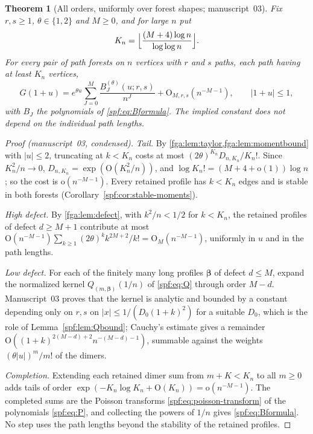 \documentclass[11pt]{article}
\numberwithin{equation}{section}
\newtheorem{theorem}{Theorem}[section]
\theoremstyle{definition}
\theoremstyle{remark}
\theoremstyle{definition}
\newcommand{\bigO}{\mathrm O}
\newcommand{\smallo}{\mathrm o}
\begin{document}
\begin{theorem}[All orders, uniformly over forest shapes; manuscript~03]
\label{fga:thm:allorders}
Fix $r,s\ge1$, $\theta\in\{1,2\}$ and $M\ge0$, and for large $n$ put
\begin{equation}
 K_n=\Bigl\lfloor\frac{(M+4)\log n}{\log\log n}\Bigr\rfloor.
 \label{fga:eq:Kn}
\end{equation}
For every pair of path forests on $n$ vertices with $r$ and $s$ paths, each
path having at least $K_n$ vertices,
\begin{equation}
 G(1+u)=e^{\theta u}\sum_{J=0}^{M}\frac{B_J^{(\theta)}(u;r,s)}{n^J}
 +\bigO_{M,r,s}(n^{-M-1}),\qquad|1+u|\le1,
 \label{fga:eq:allorders}
\end{equation}
with $B_J$ the polynomials of \eqref{spf:eq:Bformula}. The implied constant
does not depend on the individual path lengths.
\end{theorem}
\begin{proof}[Proof (manuscript~03, condensed)]
\emph{Tail.} By \cref{fga:lem:taylor,fga:lem:momentbound} with $|u|\le2$,
truncating at $k<K_n$ costs at most $(2\theta)^{K_n}D_{n,K_n}/K_n!$. Since
$K_n^2/n\to0$, $D_{n,K_n}=\exp(\bigO(K_n^2/n))$, and
$\log K_n!=(M+4+\smallo(1))\log n$; so the cost is $\smallo(n^{-M-1})$. Every
retained profile has $k<K_n$ edges and is stable in both forests
(Corollary~\ref{spf:cor:stable-moments}).

\emph{High defect.} By \cref{fga:lem:defect}, with $k^2/n<1/2$ for $k<K_n$,
the retained profiles of defect $d\ge M+1$ contribute at most
$\bigO(n^{-M-1})\sum_{k\ge1}(2\theta)^kk^{2M+2}/k!=\bigO_M(n^{-M-1})$,
uniformly in $u$ and in the path lengths.

\emph{Low defect.} For each of the finitely many long profiles
$\boldsymbol\beta$ of defect $d\le M$, expand the normalized kernel
$Q_{(m,\boldsymbol\beta)}(1/n)$ of \eqref{spf:eq:Q} through order $M-d$.
Manuscript~03 proves that the kernel is analytic and bounded by a constant
depending only on $r,s$ on $|x|\le1/(D_0(1+k)^2)$ for a suitable $D_0$,
which is the role of Lemma~\ref{spf:lem:Qbound}; Cauchy's estimate gives a
remainder $\bigO((1+k)^{2(M-d)+2}n^{-(M-d)-1})$, summable against the
weights $(\theta|u|)^m/m!$ of the dimers.

\emph{Completion.} Extending each retained dimer sum from $m+K<K_n$ to all
$m\ge0$ adds tails of order $\exp(-K_n\log K_n+\bigO(K_n))=\smallo(n^{-M-1})$.
The completed sums are the Poisson transforms \eqref{spf:eq:poisson-transform}
of the polynomials \eqref{spf:eq:P}, and collecting the powers of $1/n$
gives \eqref{spf:eq:Bformula}. No step uses the path lengths beyond the
stability of the retained profiles.
\end{proof}
\end{document}
